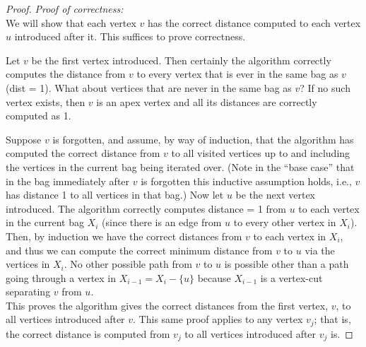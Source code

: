 \documentclass{article}
\begin{document}
\begin{proof}
\noindent \emph{Proof of correctness:}\\
We will show that each vertex $v$ has the correct distance computed to each vertex $u$ introduced after it. This suffices to prove correctness.

Let $v$ be the first vertex introduced.
Then certainly the algorithm correctly computes the distance from $v$ to every vertex that is ever in the same bag as $v$ (dist = 1).
What about vertices that are never in the same bag as $v$?
If no such vertex exists, then $v$ is an apex vertex and all its distances are correctly computed as 1.

Suppose $v$ is forgotten, and assume, by way of induction, that the algorithm has computed the correct distance from $v$ to all visited vertices up to and including the vertices in the current bag being iterated over.
(Note in the ``base case'' that in the bag immediately after $v$ is forgotten this inductive assumption holds, i.e., $v$ has distance 1 to all vertices in that bag.)
Now let $u$ be the next vertex introduced.
The algorithm correctly computes distance = 1 from $u$ to each vertex in the current bag $X_i$ (since there is an edge from $u$ to every other vertex in $X_i$).
Then, by induction we have the correct distances from $v$ to each vertex in $X_i$, and thus we can compute the correct minimum distance from $v$ to $u$ via the vertices in $X_i$.
No other possible path from $v$ to $u$ is possible other than a path going through a vertex in $X_{i-1} = X_i-\{u\}$ because $X_{i-1}$ is a vertex-cut separating $v$ from $u$.\\

This proves the algorithm gives the correct distances from the first vertex, $v$, to all vertices introduced after $v$.
This same proof applies to any vertex $v_j$; that is, the correct distance is computed from $v_j$ to all vertices introduced after $v_j$ is.
\end{proof}
\end{document}
